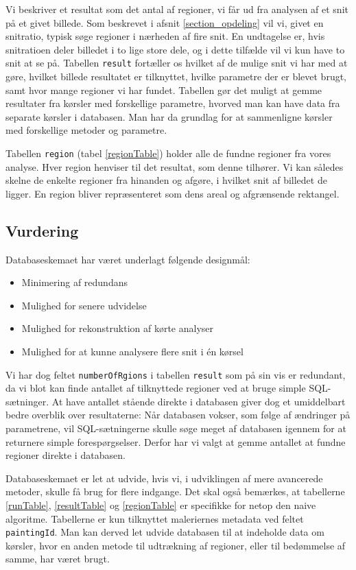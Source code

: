 {Vi beskriver et resultat som det antal af regioner, vi får ud fra
analysen af et snit på et givet billede. Som beskrevet i afsnit
\ref{section_opdeling} vil vi, givet en snitratio, typisk søge regioner
i nærheden af fire snit. En undtagelse er, hvis snitratioen deler
billedet i to lige store dele, og i dette tilfælde vil vi kun have to
snit at se på. Tabellen \texttt{result} fortæller os hvilket af de
mulige snit vi har med at gøre, hvilket billede resultatet er
tilknyttet, hvilke parametre der er blevet brugt, samt hvor mange
regioner vi har fundet. Tabellen gør det muligt at gemme resultater fra
kørsler med forskellige parametre, hvorved man kan have data fra
separate kørsler i databasen. Man har da grundlag for at sammenligne
kørsler med forskellige metoder og parametre.

Tabellen \texttt{region} (tabel \ref{regionTable}) holder alle de fundne
regioner fra vores analyse. Hver region henviser til det resultat, som
denne tilhører. Vi kan således skelne de enkelte regioner fra hinanden
og afgøre, i hvilket snit af billedet de ligger. En region bliver
repræsenteret som dens areal og afgrænsende rektangel.

\subsection{Vurdering}
Databaseskemaet har været underlagt følgende designmål:

\begin{itemize}
    \item Minimering af redundans
    \item Mulighed for senere udvidelse
    \item Mulighed for rekonstruktion af kørte analyser
    \item Mulighed for at kunne analysere flere snit i én kørsel
\end{itemize}

Vi har dog feltet \texttt{numberOfRgions} i tabellen \texttt{result} som
på sin vis er redundant, da vi blot kan finde antallet af tilknyttede
regioner ved at bruge simple SQL-sætninger. At have antallet stående
direkte i databasen giver dog et umiddelbart bedre overblik over
resultaterne: Når databasen vokser, som følge af ændringer på
parametrene, vil SQL-sætningerne skulle søge meget af databasen igennem
for at returnere simple forespørgselser. Derfor har vi valgt at gemme
antallet at fundne regioner direkte i databasen.

Databaseskemaet er let at udvide, hvis vi, i udviklingen af mere
avancerede metoder, skulle få brug for flere indgange. Det skal også
bemærkes, at tabellerne \ref{runTable}, \ref{resultTable} og
\ref{regionTable} er specifikke for netop den naive algoritme.
Tabellerne er kun tilknyttet maleriernes metadata ved feltet
\texttt{paintingId}. Man kan derved let udvide databasen til at
indeholde data om kørsler, hvor en anden metode til udtrækning af
regioner, eller til bedømmelse af samme, har været brugt.

}

